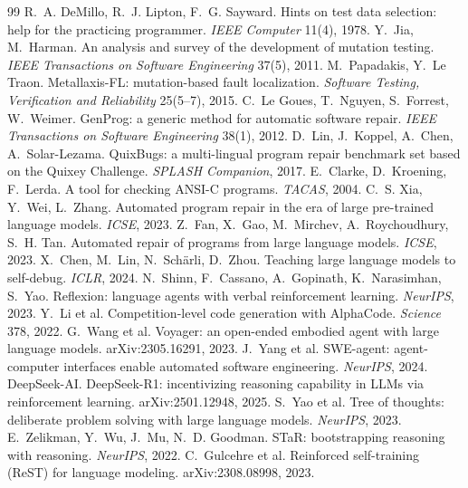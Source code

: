 \documentclass[10pt]{article}
\begin{document}
\begin{thebibliography}{99}\small
{} R.~A. DeMillo, R.~J. Lipton, F.~G. Sayward. Hints on test data selection: help for the practicing programmer. \emph{IEEE Computer} 11(4), 1978.
 Y.~Jia, M.~Harman. An analysis and survey of the development of mutation testing. \emph{IEEE Transactions on Software Engineering} 37(5), 2011.
 M.~Papadakis, Y.~Le Traon. Metallaxis-FL: mutation-based fault localization. \emph{Software Testing, Verification and Reliability} 25(5--7), 2015.
 C.~Le Goues, T.~Nguyen, S.~Forrest, W.~Weimer. GenProg: a generic method for automatic software repair. \emph{IEEE Transactions on Software Engineering} 38(1), 2012.
 D.~Lin, J.~Koppel, A.~Chen, A.~Solar-Lezama. QuixBugs: a multi-lingual program repair benchmark set based on the Quixey Challenge. \emph{SPLASH Companion}, 2017.
 E.~Clarke, D.~Kroening, F.~Lerda. A tool for checking ANSI-C programs. \emph{TACAS}, 2004.
 C.~S. Xia, Y.~Wei, L.~Zhang. Automated program repair in the era of large pre-trained language models. \emph{ICSE}, 2023.
 Z.~Fan, X.~Gao, M.~Mirchev, A.~Roychoudhury, S.~H. Tan. Automated repair of programs from large language models. \emph{ICSE}, 2023.
 X.~Chen, M.~Lin, N.~Sch\"arli, D.~Zhou. Teaching large language models to self-debug. \emph{ICLR}, 2024.
 N.~Shinn, F.~Cassano, A.~Gopinath, K.~Narasimhan, S.~Yao. Reflexion: language agents with verbal reinforcement learning. \emph{NeurIPS}, 2023.
 Y.~Li et al. Competition-level code generation with AlphaCode. \emph{Science} 378, 2022.
 G.~Wang et al. Voyager: an open-ended embodied agent with large language models. arXiv:2305.16291, 2023.
 J.~Yang et al. SWE-agent: agent-computer interfaces enable automated software engineering. \emph{NeurIPS}, 2024.
 DeepSeek-AI. DeepSeek-R1: incentivizing reasoning capability in LLMs via reinforcement learning. arXiv:2501.12948, 2025.
 S.~Yao et al. Tree of thoughts: deliberate problem solving with large language models. \emph{NeurIPS}, 2023.
 E.~Zelikman, Y.~Wu, J.~Mu, N.~D. Goodman. STaR: bootstrapping reasoning with reasoning. \emph{NeurIPS}, 2022.
 C.~Gulcehre et al. Reinforced self-training (ReST) for language modeling. arXiv:2308.08998, 2023.
\end{thebibliography}
\end{document}
